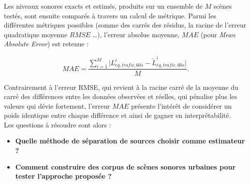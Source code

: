 Les niveaux sonores exacts et estimés, produits sur un ensemble de $M$ scènes testés, sont ensuite comparés à travers un calcul de métrique. Parmi les différentes métriques possibles (somme des carrés des résidus, la racine de l'erreur quadratique moyenne $RMSE$ \dots), l'erreur absolue moyenne, $MAE$ (pour \textit{Mean Absolute Error}) est retenue :

\begin{equation}
MAE = \frac{\sum_{i = 1}^{M} \vert L_{eq, trafic, 60s}^i - \tilde{L}_{eq, trafic, 60s}^i \vert}{M}.
\end{equation}

Contrairement à l'erreur RMSE, qui revient à la racine carré de la moyenne du carré des différences entre les données observées et réelles, qui pénalise plus les valeurs qui dévie fortement, l'erreur $MAE$ présente l'intérêt de considérer un poids identique entre chaque différence et ainsi de gagner en interprétabilité.\\

Les questions à résoudre sont alors :
\begin{itemize}
\item \textbf{Quelle méthode de séparation de sources choisir comme estimateur ?}
\item \textbf{Comment construire des corpus de scènes sonores urbaines pour tester l'approche proposée ?}
\end{itemize}

